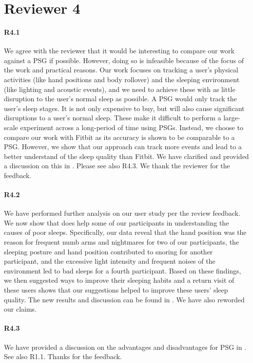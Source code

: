 \section*{Reviewer 4}

\paragraph{R4.1} We agree with the reviewer that it would be interesting to compare our work against a PSG if possible. However, doing so
is infeasible because of the focus of the work and practical reasons. Our work focuses on tracking a user's physical activities (like hand
positions and body rollover) and the sleeping environment (like lighting and acoustic events), and we need to achieve these with as little
disruption to the user's normal sleep as possible. A PSG would only track the user's sleep stages. It is not only expensive to buy, but
will also cause significant disruptions to a user's normal sleep. These make it difficult to perform a large-scale experiment across a
long-period of time using PSGs. Instead, we choose to compare our work with Fitbit as its accuracy is shown to be comparable to a PSG.
However, we show that our approach can track more events and lead to a better understand of the sleep quality than Fitbit. We have
clarified and provided a discussion on this in . Please see also R4.3. We thank the reviewer for the feedback.

\paragraph{R4.2} We have performed further analysis on our user study per the review feedback. We now show that {\systemname} does help some of
our participants in understanding the causes of poor sleeps. Specifically, our data reveal that the hand position was the reason for
frequent numb arms and nightmares for two of our participants, the sleeping posture and hand position contributed to snoring for another
participant, and the excessive light intensity and frequent noises of the environment led to bad sleeps for a fourth participant. Based on
these findings, we then suggested ways to improve their sleeping habits and a return visit of these users shows that our suggestions helped
to improve these users' sleep quality. The new results and discussion can be found in . We have also reworded our claims.


\paragraph{R4.3} We have provided a discussion on the advantages and disadvantages for PSG in . See also R1.1. Thanks for the feedback.

